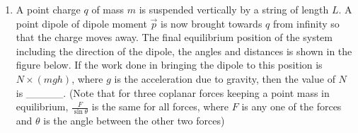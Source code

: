 
\begin{enumerate}
    \item A point charge \( q \) of mass \( m \) is suspended vertically by a string of length \( L \). A point dipole of dipole moment \( \vec{p} \) is now brought towards \( q \) from infinity so that the charge moves away. The final equilibrium position of the system including the direction of the dipole, the angles and distances is shown in the figure below. If the work done in bringing the dipole to this position is \( N \times (mgh) \), where \( g \) is the acceleration due to gravity, then the value of \( N \) is \_\_\_\_\_. (Note that for three coplanar forces keeping a point mass in equilibrium, \( \frac{F}{\sin\theta} \) is the same for all forces, where \( F \) is any one of the forces and \( \theta \) is the angle between the other two forces)
    \begin{center}
    \end{center}
\end{enumerate}
